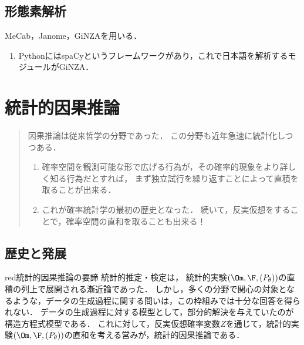 \documentclass[uplatex,dvipdfmx]{jsreport}
\begin{document}
\section{形態素解析}

\begin{example}
    MeCab，Janome，GiNZAを用いる．
    \begin{enumerate}
        \item PythonにはspaCyというフレームワークがあり，これで日本語を解析するモジュールがGiNZA．
    \end{enumerate}
\end{example}
\begin{remark}
    
\end{remark}

\chapter{統計的因果推論}

\begin{quotation}
    因果推論は従来哲学の分野であった．
    この分野も近年急速に統計化しつつある．
    \begin{enumerate}
        \item 確率空間を観測可能な形で広げる行為が，その確率的現象をより詳しく知る行為だとすれば，
        まず独立試行を繰り返すことによって直積を取ることが出来る．
        \item これが確率統計学の最初の歴史となった．
        続いて，反実仮想をすることで，確率空間の直和を取ることも出来る！
    \end{enumerate}
\end{quotation}

\section{歴史と発展}

\begin{tbox}{red}{統計的因果推論の要諦}
    統計的推定・検定は，
    統計的実験$(\Om,\F,(P_\theta))$の直積の列上で展開される漸近論であった．
    しかし，多くの分野で関心の対象となるような，データの生成過程に関する問いは，この枠組みでは十分な回答を得られない．
    データの生成過程に対する模型として，部分的解決を与えていたのが構造方程式模型である．
    これに対して，反実仮想確率変数$Z$を通じて，統計的実験$(\Om,\F,(P_\theta))$の直和を考える営みが，統計的因果推論である\cite{清水昌平10-slide}．
\end{tbox}
\end{document}
